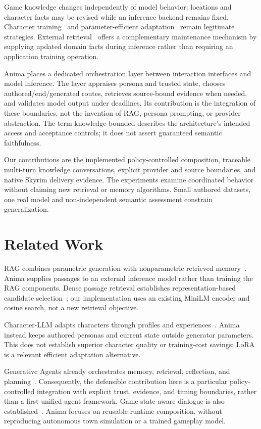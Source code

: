 \documentclass[conference]{IEEEtran}
\begin{document}
Game knowledge changes independently of model behavior: locations and character facts may be revised while an inference backend remains fixed. Character training~\cite{shao2023} and parameter-efficient adaptation~\cite{hu2022} remain legitimate strategies. External retrieval~\cite{lewis2020} offers a complementary maintenance mechanism by supplying updated domain facts during inference rather than requiring an application training operation.

Anima places a dedicated orchestration layer between interaction interfaces and model inference. The layer appraises persona and trusted state, chooses authored/end/generated routes, retrieves source-bound evidence when needed, and validates model output under deadlines. Its contribution is the integration of these boundaries, not the invention of RAG, persona prompting, or provider abstraction. The term knowledge-bounded describes the architecture's intended access and acceptance controls; it does not assert guaranteed semantic faithfulness.

Our contributions are the implemented policy-controlled composition, traceable multi-turn knowledge conversations, explicit provider and source boundaries, and native Skyrim delivery evidence. The experiments examine coordinated behavior without claiming new retrieval or memory algorithms. Small authored datasets, one real model and non-independent semantic assessment constrain generalization.

\section{Related Work}
RAG combines parametric generation with nonparametric retrieved memory~\cite{lewis2020}. Anima supplies passages to an external inference model rather than training the RAG components. Dense passage retrieval establishes representation-based candidate selection~\cite{karpukhin2020}; our implementation uses an existing MiniLM encoder and cosine search, not a new retrieval objective.

Character-LLM adapts characters through profiles and experiences~\cite{shao2023}. Anima instead keeps authored personas and current state outside generator parameters. This does not establish superior character quality or training-cost savings; LoRA~\cite{hu2022} is a relevant efficient adaptation alternative.

Generative Agents already orchestrates memory, retrieval, reflection, and planning~\cite{park2023}. Consequently, the defensible contribution here is a particular policy-controlled integration with explicit trust, evidence, and timing boundaries, rather than a first unified agent framework. Game-state-aware dialogue is also established~\cite{callison2022}. Anima focuses on reusable runtime composition, without reproducing autonomous town simulation or a trained gameplay model.
\end{document}
